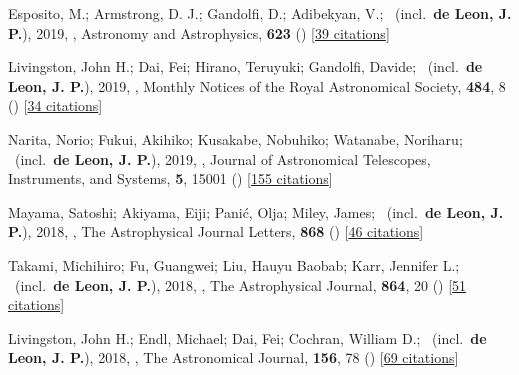 \item[{\color{numcolor}\scriptsize10}] Esposito, M.; Armstrong, D. J.; Gandolfi, D.; Adibekyan, V.; \etal\ (incl.\ \textbf{de Leon, J. P.}), 2019, , Astronomy and Astrophysics, \textbf{623} () [\href{https://ui.adsabs.harvard.edu/abs/2019A&A...623A.165E}{39 citations}]

\item[{\color{numcolor}\scriptsize9}] Livingston, John H.; Dai, Fei; Hirano, Teruyuki; Gandolfi, Davide; \etal\ (incl.\ \textbf{de Leon, J. P.}), 2019, , Monthly Notices of the Royal Astronomical Society, \textbf{484}, 8 () [\href{https://ui.adsabs.harvard.edu/abs/2019MNRAS.484....8L}{34 citations}]

\item[{\color{numcolor}\scriptsize8}] Narita, Norio; Fukui, Akihiko; Kusakabe, Nobuhiko; Watanabe, Noriharu; \etal\ (incl.\ \textbf{de Leon, J. P.}), 2019, , Journal of Astronomical Telescopes, Instruments, and Systems, \textbf{5}, 15001 () [\href{https://ui.adsabs.harvard.edu/abs/2019JATIS...5a5001N}{155 citations}]

\item[{\color{numcolor}\scriptsize7}] Mayama, Satoshi; Akiyama, Eiji; Pani{\'c}, Olja; Miley, James; \etal\ (incl.\ \textbf{de Leon, J. P.}), 2018, , The Astrophysical Journal Letters, \textbf{868} () [\href{https://ui.adsabs.harvard.edu/abs/2018ApJ...868L...3M}{46 citations}]

\item[{\color{numcolor}\scriptsize6}] Takami, Michihiro; Fu, Guangwei; Liu, Hauyu Baobab; Karr, Jennifer L.; \etal\ (incl.\ \textbf{de Leon, J. P.}), 2018, , The Astrophysical Journal, \textbf{864}, 20 () [\href{https://ui.adsabs.harvard.edu/abs/2018ApJ...864...20T}{51 citations}]

\item[{\color{numcolor}\scriptsize5}] Livingston, John H.; Endl, Michael; Dai, Fei; Cochran, William D.; \etal\ (incl.\ \textbf{de Leon, J. P.}), 2018, , The Astronomical Journal, \textbf{156}, 78 () [\href{https://ui.adsabs.harvard.edu/abs/2018AJ....156...78L}{69 citations}]

